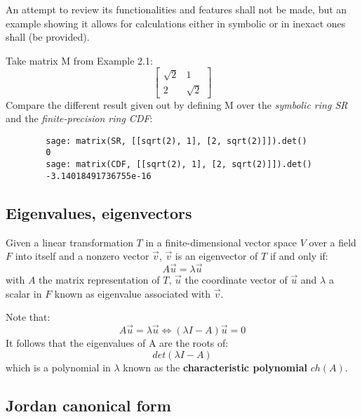 An attempt to review its functionalities and features shall not be made, but an
example showing it allows for calculations either in symbolic or in inexact ones shall (be provided).
\begin{exmp}
    Take matrix M from Example 2.1:
    \[
        \begin{bmatrix}
            \sqrt{2}  &   1    \\
                2     & \sqrt{2}
        \end{bmatrix}
    \]
    Compare the different result given out by defining M over the \textit{symbolic ring SR} and the \textit{finite-precision ring
    CDF}:
    \begin{verbatim}
        sage: matrix(SR, [[sqrt(2), 1], [2, sqrt(2)]]).det()
        0
        sage: matrix(CDF, [[sqrt(2), 1], [2, sqrt(2)]]).det()
        -3.14018491736755e-16
    \end{verbatim}
\end{exmp}

\subsection*{Eigenvalues, eigenvectors}

\begin{definition}
    Given a linear transformation \(T\) in a finite-dimensional vector space \(V\) over a field \(F\) into itself and a nonzero
    vector
    \(\vec{v}\), \(\vec{v}\) is an eigenvector of \(T\) if and only if:
    \[ A \vec{u} = \lambda \vec{u} \]
    with \(A\) the matrix representation of \(T\), \(\vec{u}\) the coordinate vector of \(\vec{u}\) and \(\lambda\) a scalar in
    \(F\) known as eigenvalue associated with \(\vec{v}\).
\end{definition}

\begin{remark}
    Note that:
    \[ A \vec{u} = \lambda \vec{u} \iff (\lambda I - A)\vec{u} = 0 \]
    It follows that the eigenvalues of A are the roots of:
    \[ det(\lambda I - A) \]
    which is a polynomial in \(\lambda\) known as the \textbf{characteristic polynomial} \(ch(A)\).
\end{remark}

\subsection*{Jordan canonical form}